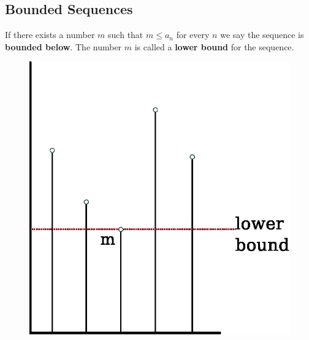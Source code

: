 \subsection{Bounded Sequences}
\begin{defn}
  If there exists a number $m$ such that $m \leq a_n$ for every $n$ we say the sequence is \textbf{bounded below}.
  The number $m$ is called a \textbf{lower bound} for the sequence.
  \begin{figure}[h]
    \begin{center}
      \includegraphics[scale=0.5]{continuous/sequence/lwrbnd}
    \end{center}
  \end{figure}
\end{defn}
